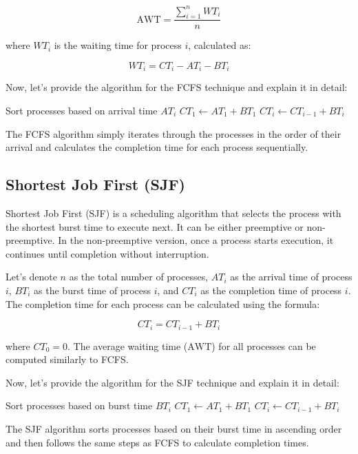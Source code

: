 \documentclass[12pt]{book} %
\begin{document}
\[
\text{AWT} = \frac{\sum_{i=1}^{n} WT_i}{n}
\]

where $WT_i$ is the waiting time for process $i$, calculated as:

\[
WT_i = CT_i - AT_i - BT_i
\]

Now, let's provide the algorithm for the FCFS technique and explain it in detail:
\FloatBarrier
\begin{algorithm}[H]
\caption{First-Come, First-Served (FCFS) Scheduling}
\begin{algorithmic}[1]
\State Sort processes based on arrival time $AT_i$
\State $CT_1 \gets AT_1 + BT_1$
    \State $CT_i \gets CT_{i-1} + BT_i$
\EndFor
\end{algorithmic}
\end{algorithm}
\FloatBarrier
The FCFS algorithm simply iterates through the processes in the order of their arrival and calculates the completion time for each process sequentially.

\subsection{Shortest Job First (SJF)}

Shortest Job First (SJF) is a scheduling algorithm that selects the process with the shortest burst time to execute next. It can be either preemptive or non-preemptive. In the non-preemptive version, once a process starts execution, it continues until completion without interruption.

Let's denote $n$ as the total number of processes, $AT_i$ as the arrival time of process $i$, $BT_i$ as the burst time of process $i$, and $CT_i$ as the completion time of process $i$. The completion time for each process can be calculated using the formula:

\[
CT_i = CT_{i-1} + BT_i
\]

where $CT_0 = 0$. The average waiting time ($\text{AWT}$) for all processes can be computed similarly to FCFS.

Now, let's provide the algorithm for the SJF technique and explain it in detail:
\FloatBarrier
\begin{algorithm}[H]
\caption{Shortest Job First (SJF) Scheduling}
\begin{algorithmic}[1]
\State Sort processes based on burst time $BT_i$
\State $CT_1 \gets AT_1 + BT_1$
    \State $CT_i \gets CT_{i-1} + BT_i$
\EndFor
\end{algorithmic}
\end{algorithm}
\FloatBarrier
The SJF algorithm sorts processes based on their burst time in ascending order and then follows the same steps as FCFS to calculate completion times.
\end{document}
